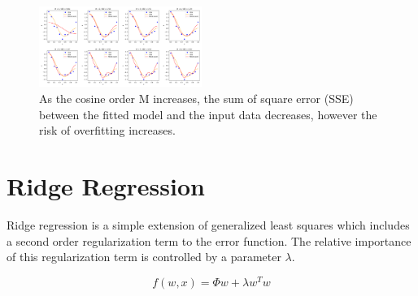 \documentclass[10pt, twocolumn]{article}
\begin{document}
\begin{figure}
\caption{As the cosine order M increases, the sum of square error (SSE) between the fitted model and the input data decreases, however the risk of overfitting increases.}
\begin{center}
\includegraphics[width=200px]{all_regress_cos}
\end{center}
\label{fig:cos_fitting}
\end{figure}

%

\section{Ridge Regression}

Ridge regression is a simple extension of generalized least squares which includes a second order regularization term to the error function. The relative importance of this regularization term is controlled by a parameter $\lambda$. 

$$f(w,x) = \Phi w + \lambda w^Tw$$
\end{document}
